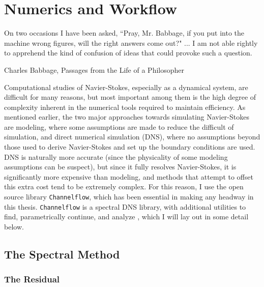 \chapter{Numerics and Workflow}

    	 	\epigraph{On two occasions I have been asked, ``Pray, Mr. Babbage, if you put into the machine wrong figures, will the right answers come out?" ... I am not able rightly to apprehend the kind of confusion of ideas that could provoke such a question.}{Charles Babbage, Passages from the Life of a Philosopher}

Computational studies of Navier-Stokes, especially as a dynamical system, are difficult for many reasons, but most important among them is the high degree of complexity inherent in the numerical tools required to maintain efficiency. As mentioned earlier, the two major approaches towards simulating Navier-Stokes are modeling, where some assumptions are made to reduce the difficult of simulation, and direct numerical simulation (DNS), where no assumptions beyond those used to derive Navier-Stokes and set up the boundary conditions are used. DNS is naturally more accurate (since the physicality of some modeling assumptions can be suspect), but since it fully resolves Navier-Stokes, it is significantly more expensive than modeling, and methods that attempt to offset this extra cost tend to be extremely complex. For this reason, I use the open source library {\tt Channelflow}, which has been essential in making any headway in this thesis. {\tt Channelflow} is a spectral DNS library, with additional utilities to find, parametrically continue, and analyze \ecs, which I will lay out in some detail below.
\section{The Spectral Method}
\subsection{The Residual}

